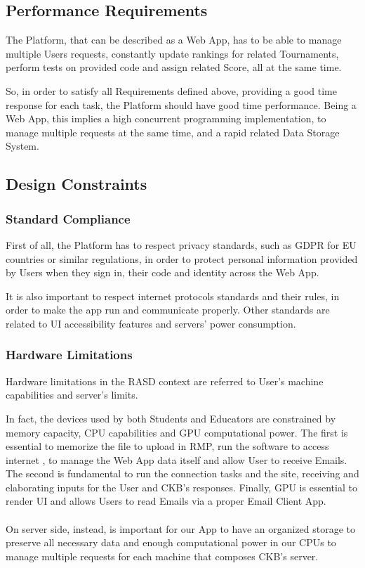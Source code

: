 \subsection{Performance Requirements}
The Platform, that can be described as a Web App, has to be able to manage multiple Users requests, constantly update rankings for related Tournaments, perform tests on provided code and assign related Score, all at the same time. 

So, in order to satisfy all Requirements defined above, providing a good time response for each task, the Platform should have good time performance. Being a Web App, this implies a high concurrent programming implementation, to 
manage multiple requests at the same time, and a rapid related Data Storage System. 

\subsection{Design Constraints}

\subsubsection{Standard Compliance}
First of all, the Platform has to respect privacy standards, such as GDPR for EU countries or similar regulations, in order to protect personal information provided by Users when they sign in, their code and identity across the Web App.

It is also important to respect internet protocols standards and their rules, in order to make the app run and communicate properly. Other standards are related to UI accessibility features and servers' power consumption. 

\subsubsection{Hardware Limitations}
Hardware limitations in the RASD context are referred to User's machine capabilities and server's limits. 

In fact, the devices used by both Students and Educators are constrained by memory capacity, CPU capabilities and GPU computational power. The first is essential to memorize the file to upload in RMP, run the software to access internet
, to manage the Web App data itself and allow User to receive Emails. The second is fundamental to run the connection tasks and the site, receiving and elaborating inputs for the User and CKB's responses. Finally, GPU is essential to render UI and allows Users to read Emails via a proper Email Client App.\\
\\
 On server side, instead, is important for our App to have an organized storage to preserve all necessary data and enough computational power in our CPUs to manage multiple requests for each machine that composes CKB's server. 
 
